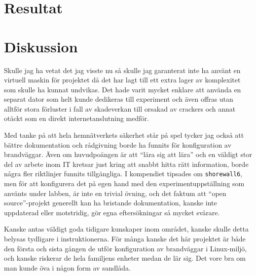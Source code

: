 %
%
%


\section{Resultat}


\section{Diskussion}
Skulle jag ha vetat det jag visste nu så skulle jag garanterat inte ha använt
en virtuell maskin för projektet då det har lagt till ett extra lager av
komplexitet som skulle ha kunnat undvikas. Det hade varit mycket enklare att
använda en separat dator som helt kunde dedikeras till experiment och även
offras utan alltför stora förluster i fall av skadeverkan till orsakad av
crackers och annat otäckt som en direkt internetanslutning medför.

Med tanke på att hela hemnätverkets säkerhet står på spel tycker jag också att
bättre dokumentation och rådgivning borde ha funnits för konfiguration av
brandväggar.  Även om huvudpoängen är att ``lära sig att lära'' och en väldigt
stor del av arbete inom IT kretsar just kring att snabbt hitta rätt
information, borde några fler riktlinjer funnits tillgängliga.  I kompendiet
tipsades om \texttt{shorewall6}, men för att konfigurera det på egen hand med
den experimentuppställning som använts under labben, är inte en trivial övning,
och det faktum att ``open source''-projekt generellt kan ha bristande
dokumentation, kanske inte uppdaterad eller motstridig, gör egna eftersökningar
så mycket svårare.

Kanske antas väldigt goda tidigare kunskaper inom området, kanske skulle detta
belysas tydligare i instruktionerna. För många kanske det här projektet är både
den första och sista gången de utför konfiguration av brandväggar i
Linux-miljö, och kanske riskerar de hela familjens enheter medan de lär sig.
Det vore bra om man kunde öva i någon form av sandlåda.


